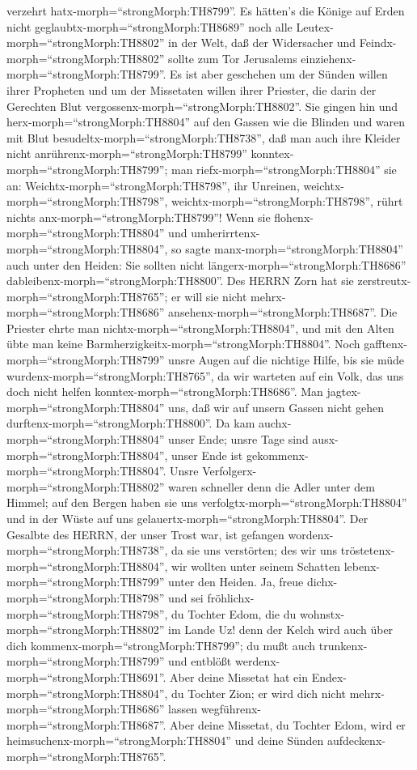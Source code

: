 verzehrt hatx-morph=``strongMorph:TH8799''.  Es hätten's
die Könige auf Erden nicht geglaubtx-morph=``strongMorph:TH8689'' noch
alle Leutex-morph=``strongMorph:TH8802'' in der Welt, daß der
Widersacher und Feindx-morph=``strongMorph:TH8802'' sollte zum Tor
Jerusalems einziehenx-morph=``strongMorph:TH8799''.  Es ist
aber geschehen um der Sünden willen ihrer Propheten und um der
Missetaten willen ihrer Priester, die darin der Gerechten Blut
vergossenx-morph=``strongMorph:TH8802''.  Sie gingen hin
und herx-morph=``strongMorph:TH8804'' auf den Gassen wie die Blinden und
waren mit Blut besudeltx-morph=``strongMorph:TH8738'', daß man auch ihre
Kleider nicht anrührenx-morph=``strongMorph:TH8799''
konntex-morph=``strongMorph:TH8799'';  man
riefx-morph=``strongMorph:TH8804'' sie an:
Weichtx-morph=``strongMorph:TH8798'', ihr Unreinen,
weichtx-morph=``strongMorph:TH8798'',
weichtx-morph=``strongMorph:TH8798'', rührt nichts
anx-morph=``strongMorph:TH8799''! Wenn sie
flohenx-morph=``strongMorph:TH8804'' und
umherirrtenx-morph=``strongMorph:TH8804'', so sagte
manx-morph=``strongMorph:TH8804'' auch unter den Heiden: Sie sollten
nicht längerx-morph=``strongMorph:TH8686''
dableibenx-morph=``strongMorph:TH8800''.  Des HERRN Zorn
hat sie zerstreutx-morph=``strongMorph:TH8765''; er will sie nicht
mehrx-morph=``strongMorph:TH8686''
ansehenx-morph=``strongMorph:TH8687''. Die Priester ehrte man
nichtx-morph=``strongMorph:TH8804'', und mit den Alten übte man keine
Barmherzigkeitx-morph=``strongMorph:TH8804''.  Noch
gafftenx-morph=``strongMorph:TH8799'' unsre Augen auf die nichtige
Hilfe, bis sie müde wurdenx-morph=``strongMorph:TH8765'', da wir
warteten auf ein Volk, das uns doch nicht helfen
konntex-morph=``strongMorph:TH8686''.  Man
jagtex-morph=``strongMorph:TH8804'' uns, daß wir auf unsern Gassen nicht
gehen durftenx-morph=``strongMorph:TH8800''. Da kam
auchx-morph=``strongMorph:TH8804'' unser Ende; unsre Tage sind
ausx-morph=``strongMorph:TH8804'', unser Ende ist
gekommenx-morph=``strongMorph:TH8804''.  Unsre
Verfolgerx-morph=``strongMorph:TH8802'' waren schneller denn die Adler
unter dem Himmel; auf den Bergen haben sie uns
verfolgtx-morph=``strongMorph:TH8804'' und in der Wüste auf uns
gelauertx-morph=``strongMorph:TH8804''.  Der Gesalbte des
HERRN, der unser Trost war, ist gefangen
wordenx-morph=``strongMorph:TH8738'', da sie uns verstörten; des wir uns
tröstetenx-morph=``strongMorph:TH8804'', wir wollten unter seinem
Schatten lebenx-morph=``strongMorph:TH8799'' unter den Heiden.
 Ja, freue dichx-morph=``strongMorph:TH8798'' und sei
fröhlichx-morph=``strongMorph:TH8798'', du Tochter Edom, die du
wohnstx-morph=``strongMorph:TH8802'' im Lande Uz! denn der Kelch wird
auch über dich kommenx-morph=``strongMorph:TH8799''; du mußt auch
trunkenx-morph=``strongMorph:TH8799'' und entblößt
werdenx-morph=``strongMorph:TH8691''.  Aber deine Missetat
hat ein Endex-morph=``strongMorph:TH8804'', du Tochter Zion; er wird
dich nicht mehrx-morph=``strongMorph:TH8686'' lassen
wegführenx-morph=``strongMorph:TH8687''. Aber deine Missetat, du Tochter
Edom, wird er heimsuchenx-morph=``strongMorph:TH8804'' und deine Sünden
aufdeckenx-morph=``strongMorph:TH8765''.

